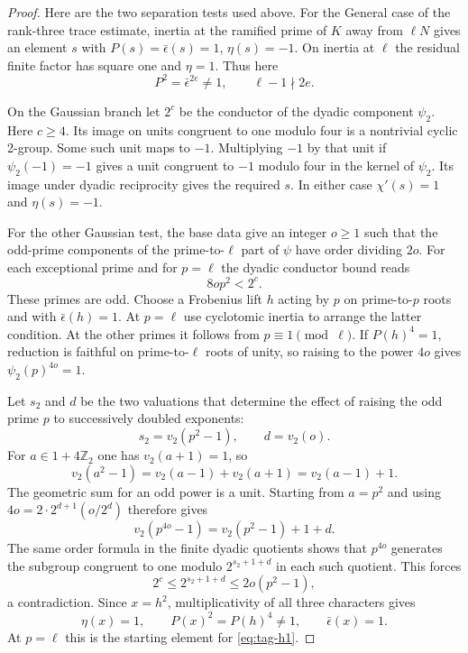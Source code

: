 \begin{proof}
Here are the two separation tests used above. For the General case of the rank-three trace estimate, inertia at the ramified prime of \(K\) away from
\(\ell N\) gives an element \(s\) with
\(P(s)=\bar\epsilon(s)=1\), \(\eta(s)=-1\). On inertia at \(\ell\) the residual finite factor has square one and \(\eta=1\). Thus here
\[
 P^2=\bar\epsilon^{2e}\ne1,\qquad \ell-1\nmid 2e .
\]

On the Gaussian branch let \(2^c\) be the
conductor of the dyadic component \(\psi_2\). Here \(c\ge4\).
Its image on units congruent to one modulo four is a nontrivial
cyclic 2-group. Some such unit maps to \(-1\). Multiplying
\(-1\) by that unit if \(\psi_2(-1)=-1\) gives a unit
congruent to \(-1\) modulo four in the kernel of \(\psi_2\).
Its image under dyadic reciprocity gives the required \(s\).
In either case \(\chi'(s)=1\) and \(\eta(s)=-1\).

For the other Gaussian test, the base data give an integer
\(o\ge1\) such that the odd-prime components of the
prime-to-\(\ell\) part of \(\psi\) have order dividing \(2o\).
For each exceptional prime and for \(p=\ell\) the dyadic conductor bound reads
\[
 8op^2<2^c .
\] These primes are odd. Choose a
Frobenius lift \(h\) acting by \(p\) on prime-to-\(p\) roots
and with \(\bar\epsilon(h)=1\). At \(p=\ell\) use cyclotomic
inertia to arrange the latter condition. At the other primes
it follows from \(p\equiv1\pmod\ell\). If \(P(h)^4=1\),
reduction is faithful on prime-to-\(\ell\) roots of unity,
so raising to the power \(4o\) gives
\(\psi_2(p)^{4o}=1\).

Let \(s_2\) and \(d\) be the two valuations that determine the effect of raising the odd prime \(p\) to successively doubled exponents:
\[
 s_2=v_2(p^2-1),\qquad d=v_2(o).
\]
For \(a\in1+4\mathbb Z_2\) one has \(v_2(a+1)=1\), so
\[
 v_2(a^2-1)=v_2(a-1)+v_2(a+1)=v_2(a-1)+1 .
\]
The geometric sum for an odd power is a unit. Starting
from \(a=p^2\) and using \(4o=2\cdot2^{d+1}(o/2^d)\)
therefore gives
\[
               v_2(p^{4o}-1)=v_2(p^2-1)+1+d .
\]
The same order formula in the finite dyadic quotients
shows that \(p^{4o}\) generates the subgroup congruent to
one modulo \(2^{s_2+1+d}\) in each such quotient. This forces
\[
 2^c\le2^{s_2+1+d}\le 2o(p^2-1),
\] a contradiction.
Since \(x=h^2\), multiplicativity of all three characters gives
\[
 \eta(x)=1,\qquad P(x)^2=P(h)^4\ne1,\qquad\bar\epsilon(x)=1 .
\] At \(p=\ell\) this is the starting
element for \eqref{eq:tag-h1}.


\end{proof}
